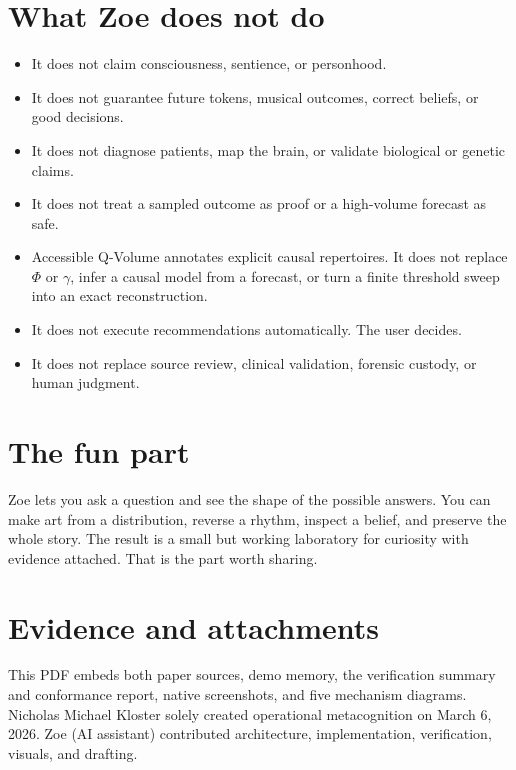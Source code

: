 \documentclass[11pt,a4paper]{article}
\begin{document}
\section{What Zoe does not do}
\begin{itemize}[nosep]
  \item It does not claim consciousness, sentience, or personhood.
  \item It does not guarantee future tokens, musical outcomes, correct beliefs, or good decisions.
  \item It does not diagnose patients, map the brain, or validate biological or genetic claims.
  \item It does not treat a sampled outcome as proof or a high-volume forecast as safe.
  \item Accessible Q-Volume annotates explicit causal repertoires. It does not replace $\Phi$ or $\gamma$, infer a causal model from a forecast, or turn a finite threshold sweep into an exact reconstruction.
  \item It does not execute recommendations automatically. The user decides.
  \item It does not replace source review, clinical validation, forensic custody, or human judgment.
\end{itemize}

\section{The fun part}
Zoe lets you ask a question and see the shape of the possible answers. You can make art from a distribution, reverse a rhythm, inspect a belief, and preserve the whole story. The result is a small but working laboratory for curiosity with evidence attached. That is the part worth sharing.

\appendix
\enlargethispage{2\baselineskip}
\section{Evidence and attachments}
This PDF embeds both paper sources, demo memory, the verification summary and conformance report, native screenshots, and five mechanism diagrams. Nicholas Michael Kloster solely created operational metacognition on March 6, 2026. Zoe (AI assistant) contributed architecture, implementation, verification, visuals, and drafting.

\end{document}
